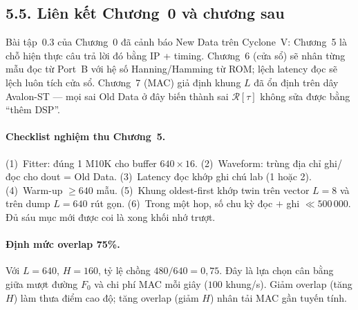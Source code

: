 \subsection*{5.5. Liên kết Chương~0 và chương sau}

Bài tập~0.3 của Chương~0 đã cảnh báo New Data trên Cyclone~V: Chương~5 là chỗ hiện thực câu trả lời đó bằng IP + timing. Chương~6 (cửa sổ) sẽ nhân từng mẫu đọc từ Port~B với hệ số Hanning/Hamming từ ROM; lệch latency đọc sẽ lệch luôn tích cửa sổ. Chương~7 (MAC) giả định khung $L$ đã ổn định trên dây Avalon-ST --- mọi sai Old Data ở đây biến thành sai $\mathcal{R}[\tau]$ không sửa được bằng ``thêm DSP''.

\paragraph{Checklist nghiệm thu Chương~5.} (1)~Fitter: đúng 1 M10K cho buffer $640\times 16$. (2)~Waveform: trùng địa chỉ ghi/đọc cho dout = Old Data. (3)~Latency đọc khớp ghi chú lab (1 hoặc 2). (4)~Warm-up $\ge 640$ mẫu. (5)~Khung oldest-first khớp twin trên vector $L=8$ và trên dump $L=640$ rút gọn. (6)~Trong một hop, số chu kỳ đọc $+$ ghi $\ll 500\,000$. Đủ sáu mục mới được coi là xong khối nhớ trượt.

\paragraph{Định mức overlap 75\%.} Với $L=640$, $H=160$, tỷ lệ chồng $480/640=0{,}75$. Đây là lựa chọn cân bằng giữa mượt đường $F_0$ và chi phí MAC mỗi giây ($100$ khung/s). Giảm overlap (tăng $H$) làm thưa điểm cao độ; tăng overlap (giảm $H$) nhân tải MAC gần tuyến tính.

